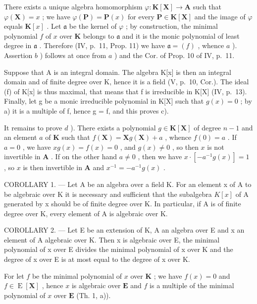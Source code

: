 There exists a unique algebra homomorphism \(\varphi: \mathbf{K}[\mathbf{X}] \to \mathbf{A}\) such that \(\varphi(\mathbf{X}) = x\) ; we have \(\varphi(\mathbf{P}) = \mathbf{P}(x)\) for every \(\mathbf{P} \in \mathbf{K}[\mathbf{X}]\) and the image of \(\varphi\) equals \(\mathbf{K}[x]\) . Let \(\mathfrak{a}\) be the kernel of \(\varphi\) ; by construction, the minimal polynomial \(f\) of \(x\) over \(\mathbf{K}\) belongs to \(\mathfrak{a}\) and it is the monic polynomial of least degree in \(\mathfrak{a}\) . Therefore (IV, p.~11, Prop. 11) we have \(\mathfrak{a} = (f)\) , whence \(a\) ). Assertion \(b\) ) follows at once from \(a\) ) and the Cor. of Prop. 10 of IV, p.~11.

Suppose that A is an integral domain. The algebra K{[}x{]} is then an integral domain and of finite degree over K, hence it is a field (V, p.~10, Cor.). The ideal (f) of K{[}x{]} is thus maximal, that means that f is irreducible in K{[}X{]} (IV, p.~13). Finally, let g be a monic irreducible polynomial in K{[}X{]} such that \(g(x) = 0\) ; by a) it is a multiple of f, hence g = f, and this proves c).

It remains to prove \(d\) ). There exists a polynomial \(g \in \mathbf{K}[\mathbf{X}]\) of degree \(n - 1\) and an element \(a\) of \(\mathbf{K}\) such that \(f(\mathbf{X}) = \mathbf{X}g(\mathbf{X}) + a\) , whence \(f(0) = a\) . If \(a = 0\) , we have \(xg(x) = f(x) = 0\) , and \(g(x) \neq 0\) , so then \(x\) is not invertible in \(\mathbf{A}\) . If on the other hand \(a \neq 0\) , then we have \(x \cdot [-a^{-1}g(x)] = 1\) , so \(x\) is then invertible in \(\mathbf{A}\) and \(x^{-1} = -a^{-1}g(x)\) .

COROLLARY 1. --- Let A be an algebra over a field K. For an element x of A to be algebraic over K it is necessary and sufficient that the subalgebra \(K[x]\) of A generated by x should be of finite degree over K. In particular, if A is of finite degree over K, every element of A is algebraic over K.

COROLLARY 2. --- Let E be an extension of K, A an algebra over E and x an element of A algebraic over K. Then x is algebraic over E, the minimal polynomial of x over E divides the minimal polynomial of x over K and the degree of x over E is at most equal to the degree of x over K.

For let \(f\) be the minimal polynomial of \(x\) over \(\mathbf{K}\) ; we have \(f(x) = 0\) and \(f \in \operatorname{E}[\mathbf{X}]\) , hence \(x\) is algebraic over \(\mathbf{E}\) and \(f\) is a multiple of the minimal polynomial of \(x\) over \(\mathbf{E}\) (Th. 1, a)).

